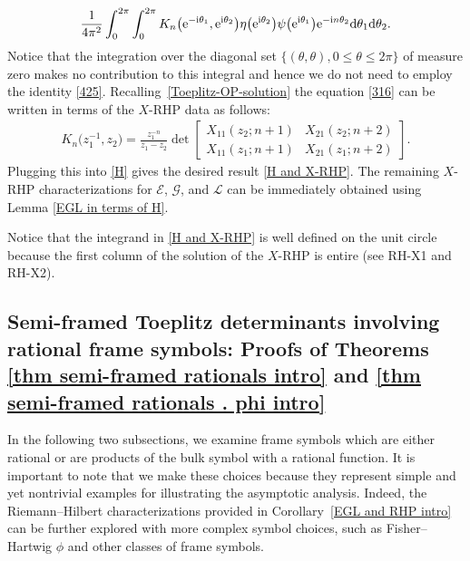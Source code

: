 \documentclass[pdftex]{sigma}
\numberwithin{equation}{section}
\newcommand{\ii}{{\rm i}}
\newcommand{\dd}{{\rm d}}
\begin{document}
		\begin{equation*} \frac{1}{4\pi^2} \int^{2\pi}_{0} \int^{2\pi}_{0} K_n\big({\rm e}^{-\ii \theta_1},{\rm e}^{\ii \theta_2}\big) \eta\big({\rm e}^{\ii \theta_2}\big) \psi\big({\rm e}^{\ii \theta_1}\big) {\rm e}^{-\ii n \theta_2} \dd \theta_1 \dd \theta_2.
		\end{equation*}
		Notice that the integration over the diagonal set $\{(\theta,\theta), 0 \leq \theta \leq 2 \pi\}$ of measure zero makes no contribution to this integral and hence we do not need to employ the identity \eqref{425}. Recalling~\eqref{Toeplitz-OP-solution} the equation \eqref{316} can be written in terms of the $X$-RHP data as follows:
		\begin{gather*}%
			K_{n}\big(z^{-1}_1,z_2\big) = \frac{z^{-n}_1}{z_1-z_2} \det \begin{bmatrix}
				X_{11}(z_2;n+1) & X_{21}(z_2;n+2) \\
				X_{11}(z_1;n+1) & X_{21}(z_1;n+2)
			\end{bmatrix}.
		\end{gather*}
		Plugging this into \eqref{H} gives the desired result \eqref{H and X-RHP}. 	The remaining $X$-RHP characterizations for $\mathscr{E}$, $\mathscr{G}$, and $\mathscr{L}$ can be immediately obtained using Lemma \ref{EGL in terms of H}.
		
		\begin{Remark} \normalfont
			Notice that the integrand in \eqref{H and X-RHP} is well defined on the unit circle because the first column of the solution of the $X$-RHP is entire (see {\rm RH-X1} and {\rm RH-X2}).
		\end{Remark}
		
\subsection[Semi-framed Toeplitz determinants involving rational frame symbols:\\ Proofs of Theorems \ref{thm semi-framed rationals intro} and \ref{thm semi-framed rationals . phi intro}]{Semi-framed Toeplitz determinants involving\\ rational frame symbols: Proofs of Theorems \ref{thm semi-framed rationals intro} and \ref{thm semi-framed rationals . phi intro}}\label{sec semi-framed}
		
In the following two subsections, we examine frame symbols which are either rational or are products of the bulk symbol with a rational function. It is important to note that we make these choices because they represent simple and yet nontrivial examples for illustrating the asymptotic analysis. Indeed, the Riemann--Hilbert characterizations provided in Corollary~\ref{EGL and RHP intro} can be further explored with more complex symbol choices, such as Fisher--Hartwig $\phi$ and other classes of frame symbols.
		
\end{document}

